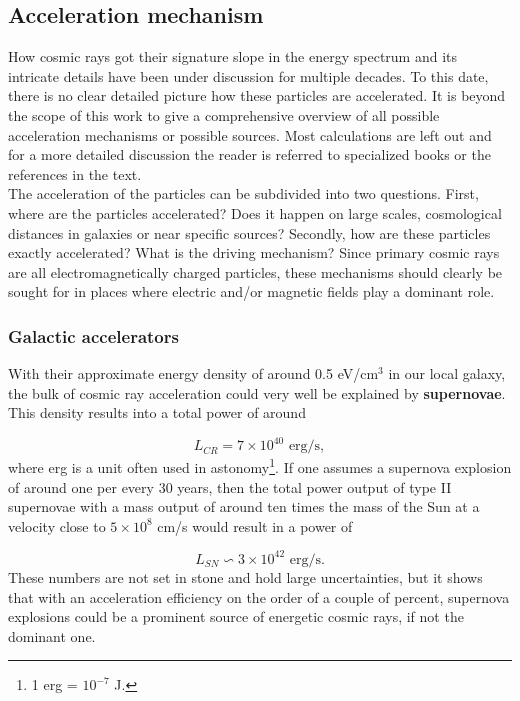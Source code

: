 \subsection{Acceleration mechanism}
How cosmic rays got their signature slope in the energy spectrum and its intricate details have been under discussion for multiple decades. To this date, there is no clear detailed picture how these particles are accelerated. It is beyond the scope of this work to give a comprehensive overview of all possible acceleration mechanisms or possible sources. Most calculations are left out and for a more detailed discussion the reader is referred to specialized books or the references in the text.\\
\newline
The acceleration of the particles can be subdivided into two questions. First, where are the particles accelerated? Does it happen on large scales, cosmological distances in galaxies or near specific sources? Secondly, how are these particles exactly accelerated? What is the driving mechanism? Since primary cosmic rays are all electromagnetically charged particles, these mechanisms should clearly be sought for in places where electric and/or magnetic fields play a dominant role.

\subsubsection{Galactic accelerators}
With their approximate energy density of around 0.5 eV/cm$^3$ in our local galaxy, the bulk of cosmic ray acceleration could very well be explained by \textbf{supernovae}. This density results into a total power of around

\begin{equation}
L_{CR} = 7 \times 10^{40} \textrm{ erg/s},
\end{equation}
where erg is a unit often used in astonomy\footnote{1 erg = $10^{-7}$ J.}. If one assumes a supernova explosion of around one per every 30 years, then the total power output of type II supernovae with a mass output of around ten times the mass of the Sun at a velocity close to $5 \times 10^{8}$ cm/s would result in a power of

\begin{equation}
L_{SN} \backsim 3 \times 10^{42} \textrm{ erg/s}.
\end{equation}
These numbers are not set in stone and hold large uncertainties, but it shows that with an acceleration efficiency on the order of a couple of percent, supernova explosions could be a prominent source of energetic cosmic rays, if not the dominant one.

